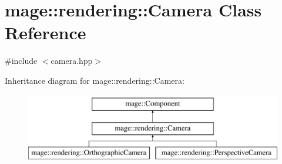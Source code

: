 \hypertarget{classmage_1_1rendering_1_1_camera}{}\section{mage\+:\+:rendering\+:\+:Camera Class Reference}
\label{classmage_1_1rendering_1_1_camera}


{\ttfamily \#include $<$camera.\+hpp$>$}

Inheritance diagram for mage\+:\+:rendering\+:\+:Camera\+:\begin{figure}[H]
\begin{center}
\leavevmode
\includegraphics[height=3.000000cm]{classmage_1_1rendering_1_1_camera}
\end{center}
\end{figure}
